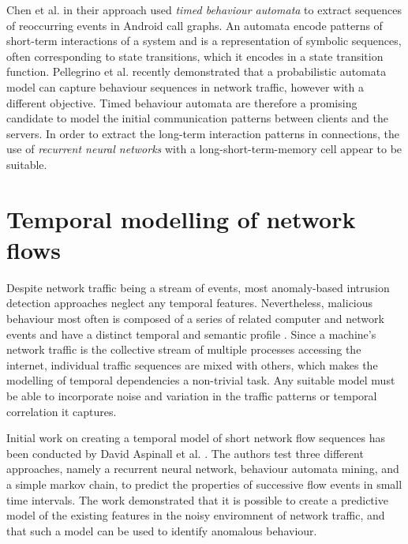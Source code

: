 \documentclass[a4paper,12pt,twoside]{article}
\begin{document}
Chen et al. \cite{chen2016robust, chen2016more} in their approach used \textit{timed behaviour automata} to extract sequences of reoccurring events in Android call graphs. An automata encode patterns  of  short-term  interactions  of  a  system  and  is  a  representation  of  symbolic
sequences, often corresponding to state transitions, which it encodes in a state transition
function. Pellegrino et al. \cite{pellegrino2017learning} recently demonstrated that a probabilistic automata model can capture behaviour sequences in network traffic, however with a different objective. Timed behaviour automata are therefore a promising candidate to model the initial communication patterns between clients and the servers. In order to extract the long-term interaction patterns in connections, the use of \textit{recurrent neural networks} with a long-short-term-memory cell appear to be suitable.


\section{Temporal modelling of network flows}

Despite network traffic being a stream of events, most anomaly-based intrusion detection approaches neglect any temporal features.  Nevertheless, malicious behaviour most often is composed of a series of related computer and network events and have a distinct temporal and semantic profile \cite{ye2000markov}. Since a machine’s network traffic is the collective stream of multiple processes accessing the internet, individual traffic sequences are mixed with others, which makes the modelling of temporal dependencies a non-trivial task. Any suitable model must be able to incorporate noise and variation in the traffic patterns or temporal correlation it captures.

Initial work on creating a temporal model of short network flow sequences has been conducted by David Aspinall et al. \cite{aspinall2018anomaly}. The authors test three different approaches, namely a recurrent neural network, behaviour automata mining, and a simple markov chain, to predict the properties of successive flow events in small time intervals. The work demonstrated that it is possible to create a predictive model of the existing features in the noisy enviromnent of network traffic, and that such a model can be used to identify anomalous behaviour. 
\end{document}
